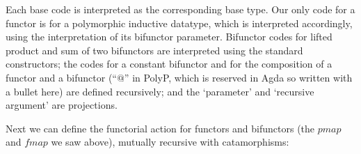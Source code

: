 \documentclass[fleqn,runningheads]{llncs}
\begin{document}
Each base code is interpreted as the corresponding base type.
Our only code for a functor is for a polymorphic inductive datatype, which is interpreted accordingly, using the interpretation of its bifunctor parameter.
Bifunctor codes for lifted product and sum of two bifunctors are interpreted using the standard constructors; the codes for a constant bifunctor and for the composition of a functor and a bifunctor (``$\atsign$'' in PolyP, which is reserved in Agda so written with a bullet here) are defined recursively; and the `parameter' and `recursive argument' are projections.

Next we can define the functorial action for functors and bifunctors (the $\mathit{pmap}$ and $\mathit{fmap}$ we saw above), mutually recursive with catamorphisms:
\begin{code}%
\>[0]\<%
\\
\>[0][@{}l@{\AgdaIndent{0}}]%
\>[2]\AgdaSymbol{\{-\#}\AgdaSpace{}%
\AgdaSpace{}%
\AgdaSymbol{\#-\}}\<%
\\
%
\>[2]%
\>[9]\AgdaSymbol{:}%
\>[12]\AgdaSymbol{(}\AgdaSpace{}%
\AgdaSymbol{:}\AgdaSpace{}%
\AgdaSymbol{)}%
\>[29]\AgdaSpace{}%
\AgdaSymbol{(}\AgdaSpace{}%
\AgdaSpace{}%
\AgdaSymbol{)}\AgdaSpace{}%
\AgdaSpace{}%
\AgdaOperator{\AgdaFunction{[[}}\AgdaSpace{}%
\AgdaSpace{}%
\AgdaOperator{\AgdaFunction{]]F}}\AgdaSpace{}%
\AgdaSpace{}%
\AgdaSpace{}%
\AgdaOperator{\AgdaFunction{[[}}\AgdaSpace{}%
\AgdaSpace{}%
\AgdaOperator{\AgdaFunction{]]F}}\AgdaSpace{}%
\<%
\\
%
\>[2]%
\>[9]\AgdaSymbol{:}%
\>[12]\AgdaSymbol{(}\AgdaSpace{}%
\AgdaSymbol{:}\AgdaSpace{}%
\AgdaSymbol{)}%
\>[29]\AgdaSpace{}%
\AgdaSymbol{(}\AgdaSpace{}%
\AgdaSpace{}%
\AgdaSymbol{)}\AgdaSpace{}%
\AgdaSpace{}%
\AgdaSymbol{(}\AgdaSpace{}%
\AgdaSpace{}%
\AgdaSymbol{)}\AgdaSpace{}%
\AgdaSpace{}%
\AgdaOperator{\AgdaFunction{[[}}\AgdaSpace{}%
\AgdaSpace{}%
\AgdaOperator{\AgdaFunction{]]B}}\AgdaSpace{}%
\AgdaSpace{}%
\AgdaSpace{}%
\AgdaSpace{}%
\AgdaOperator{\AgdaFunction{[[}}\AgdaSpace{}%
\AgdaSpace{}%

\end{code}
\end{document}
